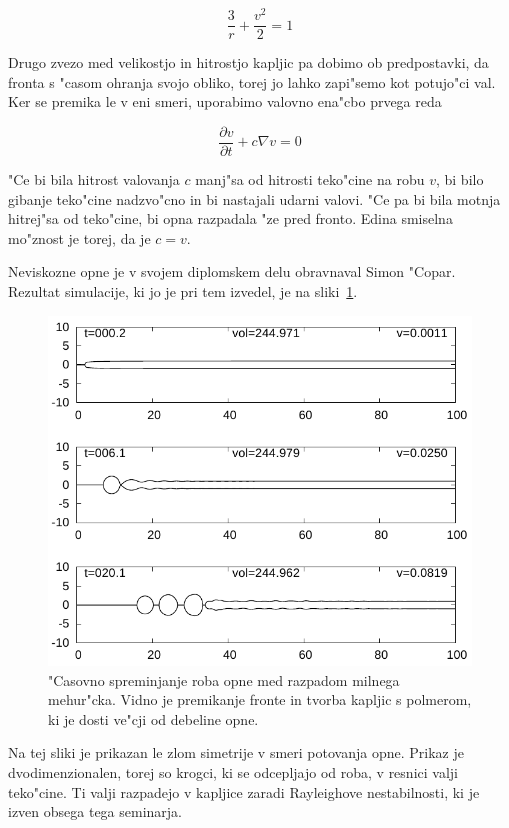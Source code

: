 \documentclass[a4paper,12pt]{article}
\begin{document}
\begin{equation}
 \frac{3}{r} + \frac{v^2}{2} = 1
\end{equation}

Drugo zvezo med velikostjo in hitrostjo kapljic pa dobimo ob predpostavki, da fronta s "casom ohranja svojo obliko, torej jo lahko zapi"semo kot potujo"ci val. Ker se premika le v eni smeri, uporabimo valovno ena"cbo prvega reda

\begin{equation}
 \frac{\partial v}{\partial t} + c \nabla v = 0
\end{equation}

"Ce bi bila hitrost valovanja $c$ manj"sa od hitrosti teko"cine na robu $v$, bi bilo gibanje teko"cine nadzvo"cno in bi nastajali udarni valovi. "Ce pa bi bila motnja hitrej"sa od teko"cine, bi opna razpadala "ze pred fronto. Edina smiselna mo"znost je torej, da je $c=v$. 

Neviskozne opne je v svojem diplomskem delu obravnaval Simon "Copar. Rezultat simulacije, ki jo je pri tem izvedel, je na sliki~\ref{fig:mehurcek-rez-1}. 

\begin{figure}[h]
  \centering
\includegraphics[width=.8\textwidth]{./Slike/mehurcek-rezultat-1}
\caption{"Casovno spreminjanje roba opne med razpadom milnega mehur"cka. Vidno je premikanje fronte in tvorba kapljic s polmerom, ki je dosti ve"cji od debeline opne.~\cite{diploma} }
\label{fig:mehurcek-rez-1}
\end{figure}

Na tej sliki je prikazan le zlom simetrije v smeri potovanja opne. Prikaz je dvodimenzionalen, torej so krogci, ki se odcepljajo od roba, v resnici valji teko"cine. Ti valji razpadejo v kapljice zaradi Rayleighove nestabilnosti, ki je izven obsega tega seminarja. 
\end{document}
